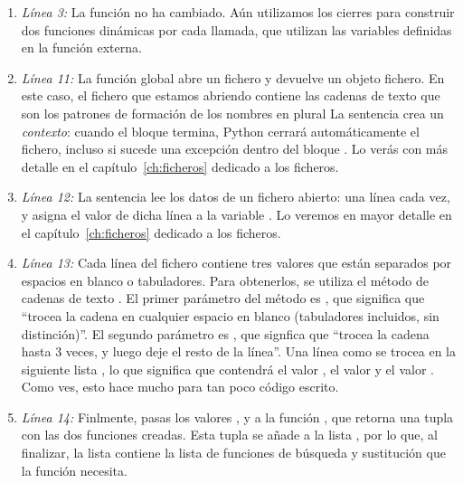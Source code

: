 \begin{enumerate}

\item \emph{Línea 3:} La función  no ha cambiado. Aún utilizamos los cierres para construir dos funciones dinámicas por cada llamada, que utilizan las variables definidas en la función externa.

\item \emph{Línea 11:} La función global  abre un fichero y devuelve un objeto fichero. En este caso, el fichero que estamos abriendo contiene las cadenas de texto que son los patrones de formación de los nombres en plural La sentencia  crea un \emph{contexto}: cuando el bloque  termina, Python cerrará automáticamente el fichero, incluso si sucede una excepción dentro del bloque . Lo verás con más detalle en el capítulo~\ref{ch:ficheros} dedicado a los ficheros.

\item \emph{Línea 12:} La sentencia  lee los datos de un fichero abierto: una línea cada vez, y asigna el valor de dicha línea a la variable . Lo veremos en mayor detalle en el capítulo~\ref{ch:ficheros} dedicado a los ficheros.

\item \emph{Línea 13:} Cada línea del fichero contiene tres valores que están separados por espacios en blanco o tabuladores. Para obtenerlos, se utiliza el método de cadenas de texto . El primer parámetro del método  es , que significa que ``trocea la cadena en cualquier espacio en blanco (tabuladores incluidos, sin distinción)''. El segundo parámetro es , que signfica que ``trocea la cadena hasta 3 veces, y luego deje el resto de la línea''. Una línea como  se trocea en la siguiente lista \codigo{['[sxy]\$', '\$', 'es']}, lo que significa que  contendrá el valor ,  el valor  y  el valor . Como ves, esto hace mucho para tan poco código escrito.

\item \emph{Línea 14:} Finlmente, pasas los valores ,  y  a la función , que retorna una tupla con las dos funciones creadas. Esta tupla se añade a la lista , por lo que, al finalizar, la lista  contiene la lista de funciones de búsqueda y sustitución que la función  necesita.

\end{enumerate}

